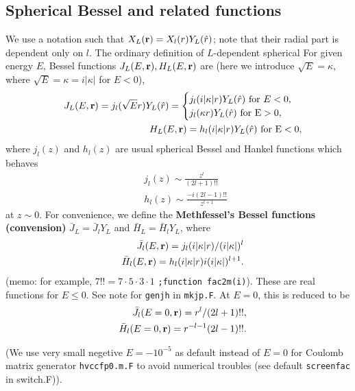 \documentclass[a4paper,10pt,fleqn]{article}
\newcommand{\bfr}{{\bf r}}
\begin{document}
\subsection{Spherical Bessel and related functions}
We use a notation such that $X_L(\bfr)=X_l(r) Y_L(\hat{r})$; note that
their radial part is dependent only on $l$.
The ordinary definition of $L$-dependent spherical 
For given energy $E$, Bessel functions
$J_L(E,\bfr),H_L(E,\bfr)$ are 
(here we introduce $\sqrt{E}=\kappa$, 
where $\sqrt{E}=\kappa=i|\kappa|$ for $E<0$),
\begin{eqnarray}
&&{J}_L(E,\bfr)=
j_l(\sqrt{E} r)Y_L(\hat{r}) =
\begin{cases}
j_l(i|\kappa| r)Y_L(\hat{r}) \ {\rm for} \ E<0, \\
j_l(\kappa r)Y_L(\hat{r})    \ {\rm for \ E>0},
\end{cases}
\nonumber \\
&&{H}_L(E,\bfr)=h_l(i|\kappa| r)Y_L(\hat{r})
\ {\rm for \ E<0}, 
\label{eq:OrdinaryBessel}
\end{eqnarray}
where $j_l(z)$ and $h_l(z)$ are usual spherical Bessel and Hankel functions
which behaves 
\begin{eqnarray}
&&j_l(z) \sim \frac{z^l}{(2l+1)!!} \nonumber \\
&&h_l(z) \sim \frac{-i(2l-1)!!}{z^{l+1}}
\end{eqnarray}
at $z \sim 0$.
For convenience, we define 
the {\bf Methfessel's Bessel functions (convension)} 
$\bar{J}_L=\bar{J}_lY_L$ and $\bar{H}_L=\bar{H}_lY_L$, where 
\begin{eqnarray}
&&\bar{J}_l(E,\bfr)=j_l(i|\kappa| r) / (i |\kappa|)^l \nonumber \\
&&\bar{H}_l(E,\bfr)=h_l(i|\kappa| r) i (i |\kappa|)^{l+1}. 
\label{eq:Mbessel}
\end{eqnarray}
(memo: for example, $7!!=7\cdot5\cdot3\cdot1$ \verb!;function fac2m(i)!).
These are real functions for $E\le 0$.
See note for \verb!genjh! in \verb!mkjp.F!.
At $E=0$, this is reduced to be 
\begin{eqnarray}
&&\bar{J}_l(E=0,\bfr)=r^l/(2l+1)!!, \nonumber \\
&&\bar{H}_l(E=0,\bfr)=r^{-l-1} (2l-1)!!.
\label{eq:jhll}
\end{eqnarray}

(We use very small negetive $E=-10^{-5}$ as default instead of $E=0$
for Coulomb matrix generator \verb#hvccfp0.m.F#
to avoid numerical troubles (see default \verb#screenfac# in switch.F)).
\end{document}
